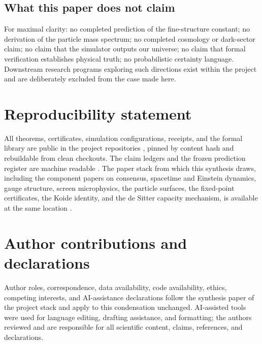 \documentclass[11pt]{article}
\theoremstyle{remark}
\begin{document}
\subsection*{What this paper does not claim}

For maximal clarity: no completed prediction of the fine-structure
constant; no derivation of the particle mass spectrum; no completed
cosmology or dark-sector claim; no claim that the simulator outputs our
universe; no claim that formal verification establishes physical truth; no
probabilistic certainty language. Downstream research programs exploring
such directions exist within the project and are deliberately excluded from
the case made here.

\section*{Reproducibility statement}

All theorems, certificates, simulation configurations, receipts, and the
formal library are public in the project repositories \cite{ophrepo,ophsim},
pinned by content hash and rebuildable from clean checkouts. The claim
ledgers and the frozen prediction register are machine readable
\cite{ophregister}. The paper stack from which this synthesis draws,
including the component papers on consensus, spacetime and Einstein
dynamics, gauge structure, screen microphysics, the particle surfaces, the
fixed-point certificates, the Koide identity, and the de Sitter capacity
mechanism, is available at the same location \cite{ophstack}.

\section*{Author contributions and declarations}

Author roles, correspondence, data availability, code availability, ethics,
competing interests, and AI-assistance declarations follow the synthesis
paper of the project stack \cite{ophstack} and apply to this condensation
unchanged. AI-assisted tools were used for language editing, drafting
assistance, and formatting; the authors reviewed and are responsible for all
scientific content, claims, references, and declarations.
\end{document}
